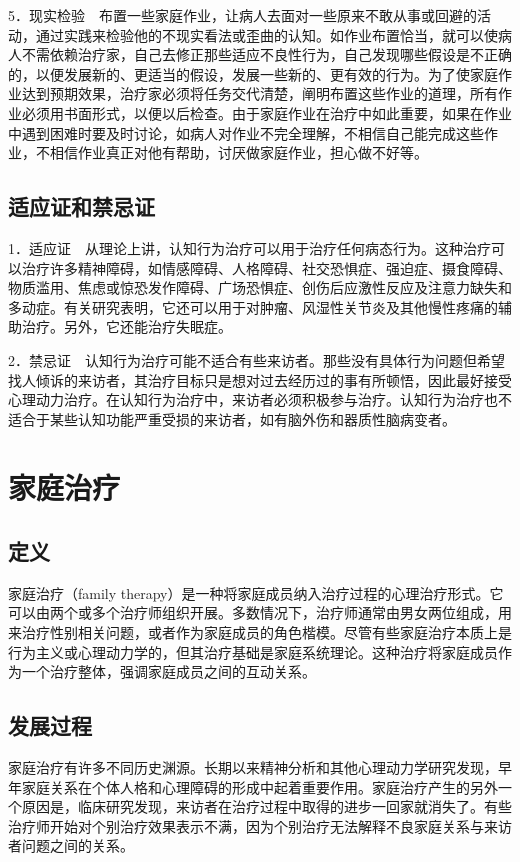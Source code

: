 5．现实检验　布置一些家庭作业，让病人去面对一些原来不敢从事或回避的活动，通过实践来检验他的不现实看法或歪曲的认知。如作业布置恰当，就可以使病人不需依赖治疗家，自己去修正那些适应不良性行为，自己发现哪些假设是不正确的，以便发展新的、更适当的假设，发展一些新的、更有效的行为。为了使家庭作业达到预期效果，治疗家必须将任务交代清楚，阐明布置这些作业的道理，所有作业必须用书面形式，以便以后检查。由于家庭作业在治疗中如此重要，如果在作业中遇到困难时要及时讨论，如病人对作业不完全理解，不相信自己能完成这些作业，不相信作业真正对他有帮助，讨厌做家庭作业，担心做不好等。

\subsection{适应证和禁忌证}

1．适应证　从理论上讲，认知行为治疗可以用于治疗任何病态行为。这种治疗可以治疗许多精神障碍，如情感障碍、人格障碍、社交恐惧症、强迫症、摄食障碍、物质滥用、焦虑或惊恐发作障碍、广场恐惧症、创伤后应激性反应及注意力缺失和多动症。有关研究表明，它还可以用于对肿瘤、风湿性关节炎及其他慢性疼痛的辅助治疗。另外，它还能治疗失眠症。

2．禁忌证　认知行为治疗可能不适合有些来访者。那些没有具体行为问题但希望找人倾诉的来访者，其治疗目标只是想对过去经历过的事有所顿悟，因此最好接受心理动力治疗。在认知行为治疗中，来访者必须积极参与治疗。认知行为治疗也不适合于某些认知功能严重受损的来访者，如有脑外伤和器质性脑病变者。


\section{家庭治疗}

\subsection{定义}

家庭治疗（family
therapy）是一种将家庭成员纳入治疗过程的心理治疗形式。它可以由两个或多个治疗师组织开展。多数情况下，治疗师通常由男女两位组成，用来治疗性别相关问题，或者作为家庭成员的角色楷模。尽管有些家庭治疗本质上是行为主义或心理动力学的，但其治疗基础是家庭系统理论。这种治疗将家庭成员作为一个治疗整体，强调家庭成员之间的互动关系。

\subsection{发展过程}

家庭治疗有许多不同历史渊源。长期以来精神分析和其他心理动力学研究发现，早年家庭关系在个体人格和心理障碍的形成中起着重要作用。家庭治疗产生的另外一个原因是，临床研究发现，来访者在治疗过程中取得的进步一回家就消失了。有些治疗师开始对个别治疗效果表示不满，因为个别治疗无法解释不良家庭关系与来访者问题之间的关系。

